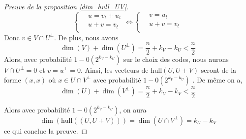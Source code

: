 \documentclass[12pt]{article}
\theoremstyle{plain}
\begin{document}
\begin{appendix}
\begin{proof}[Preuve de la proposition \ref{dim_hull_UV}]
\begin{equation*}
\left\{
\begin{aligned}
&u = v_t + u_t\\
&u + v = v_t\\
\end{aligned}
\right.
\iff
\left\{
\begin{aligned}
&v = u_t\\
&u + v = v_t\\
\end{aligned}
\right.
\end{equation*}
Donc $v\in V\cap U^{\bot}$.
De plus, nous avons $$\dim(V) + \dim(U^{\bot}) = \frac{n}{2} +k_V - k_U < \frac{n}{2}$$
Alors, avec probabilité $1-0(2^{k_V-k_U})$ sur le choix des codes, nous aurons $V \cap U^{\bot} = {0}$ et $v=u^{\bot} = 0$. Ainsi, les vecteurs de hull$(U,U+V)$ seront de la forme $(x,x)$ où $x \in U \cap V^{\bot}$ avec probabilité  $1-0(2^{k_V-k_U})$ .
De même on a,
$$\dim(U) + \dim(V^{\bot}) = \frac{n}{2} +k_U - k_V < \frac{n}{2}$$

Alors avec probabilité $1-0(2^{k_V-k_U})$, on aura 
$$\dim(\text{hull}((U,U+V))) = \dim(U\cap V^{\bot}) = k_U-k_V $$
ce qui conclue la preuve.
\end{proof}


\end{appendix}
\end{document}
